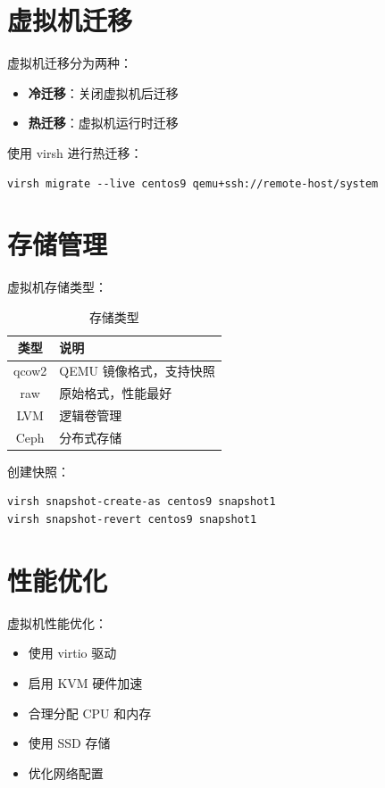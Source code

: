 \documentclass[12pt,UTF8]{ctexbook}
\begin{document}
\section{虚拟机迁移}
\label{sec:vm_migration}

虚拟机迁移分为两种：
\begin{itemize}
    \item \textbf{冷迁移}：关闭虚拟机后迁移
    \item \textbf{热迁移}：虚拟机运行时迁移
\end{itemize}

使用 virsh 进行热迁移：
\begin{verbatim}
virsh migrate --live centos9 qemu+ssh://remote-host/system
\end{verbatim}

\section{存储管理}
\label{sec:storage_management}

虚拟机存储类型：
\begin{table}[htbp]
    \centering
    \caption{存储类型}
    \begin{tabular}{|c|p{8cm}|}
        \hline
        \textbf{类型} & \textbf{说明} \\
        \hline
        qcow2 & QEMU 镜像格式，支持快照 \\
        \hline
        raw & 原始格式，性能最好 \\
        \hline
        LVM & 逻辑卷管理 \\
        \hline
        Ceph & 分布式存储 \\
        \hline
    \end{tabular}
\end{table}

创建快照：
\begin{verbatim}
virsh snapshot-create-as centos9 snapshot1
virsh snapshot-revert centos9 snapshot1
\end{verbatim}

\section{性能优化}
\label{sec:performance_optimization}

虚拟机性能优化：
\begin{itemize}
    \item 使用 virtio 驱动
    \item 启用 KVM 硬件加速
    \item 合理分配 CPU 和内存
    \item 使用 SSD 存储
    \item 优化网络配置
\end{itemize}
\end{document}

